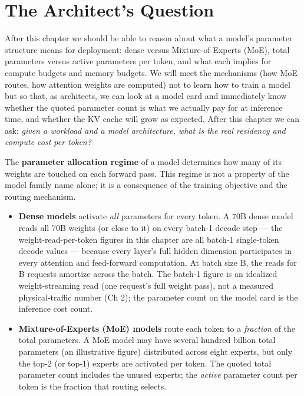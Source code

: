 \section*{The Architect's Question}\label{the-architects-question}

After this chapter we should be able to reason about what a model's
parameter structure means for deployment: dense versus
Mixture-of-Experts (MoE), total parameters versus active parameters per
token, and what each implies for compute budgets and memory budgets. We
will meet the mechanisms (how MoE routes, how attention weights are
computed) not to learn how to train a model but so that, as architects,
we can look at a model card and immediately know whether the quoted
parameter count is what we actually pay for at inference time, and
whether the KV cache will grow as expected. After this chapter we can
ask: \emph{given a workload and a model architecture, what is the real
residency and compute cost per token?}

\label{concept}


The \textbf{parameter allocation regime} of a model determines how many
of its weights are touched on each forward pass. This regime is not a
property of the model family name alone; it is a consequence of the
training objective and the routing mechanism.

\begin{itemize}
\tightlist
\item
  \textbf{Dense models} activate \emph{all} parameters for every token.
  A 70B dense model reads all 70B weights (or close to it) on every
  batch-1 decode step --- the weight-read-per-token figures in this
  chapter are all batch-1 single-token decode values --- because every
  layer's full hidden dimension participates in every attention and
  feed-forward computation. At batch size B, the reads for B requests
  amortize across the batch. The batch-1 figure is an idealized
  weight-streaming read (one request's full weight pass), not a measured
  physical-traffic number (Ch 2); the parameter count on the model card
  is the inference cost count.
\item
  \textbf{Mixture-of-Experts (MoE) models} route each token to a
  \emph{fraction} of the total parameters. A MoE model may have several
  hundred billion total parameters (an illustrative figure) distributed
  across eight experts, but only the top-2 (or top-1) experts are
  activated per token. The quoted total parameter count includes the
  unused experts; the \emph{active} parameter count per token is the
  fraction that routing selects.
\end{itemize}

